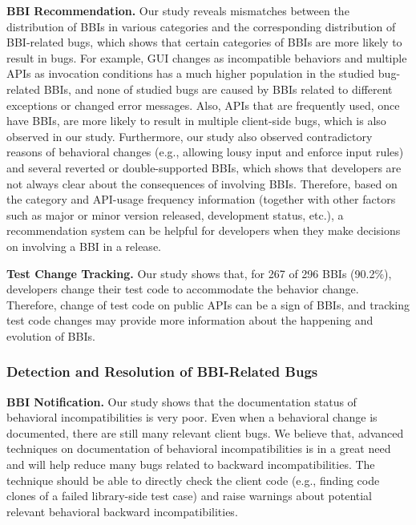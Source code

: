 


\textbf{BBI Recommendation.} Our study reveals mismatches between the distribution of BBIs in various categories and the corresponding distribution of BBI-related bugs, which shows that certain categories of BBIs are more likely to result in bugs. For example, GUI changes as incompatible behaviors and multiple APIs as invocation conditions has a much higher population in the studied bug-related BBIs, and none of studied bugs are caused by BBIs related to different exceptions or changed error messages. Also, APIs that are frequently used, once have BBIs, are more likely to result in multiple client-side bugs, which is also observed in our study. Furthermore, our study also observed contradictory reasons of behavioral changes (e.g., allowing lousy input and enforce input rules) and several reverted or double-supported BBIs, which shows that developers are not always clear about the consequences of involving BBIs. Therefore, based on the category and API-usage frequency information (together with other factors such as major or minor version released, development status, etc.), a recommendation system can be helpful for developers when they make decisions on involving a BBI in a release. 

\textbf{Test Change Tracking.} Our study shows that, for 267 of 296 BBIs (90.2\%), developers change their test code to accommodate the behavior change. Therefore, change of test code on public APIs can be a sign of BBIs, and tracking test code changes may provide more information about the happening and evolution of BBIs. 




\subsubsection{Detection and Resolution of BBI-Related Bugs}
\textbf{BBI Notification.} Our study shows that the documentation status of behavioral incompatibilities is very poor. Even when a behavioral change is documented, there are still many relevant client bugs. We believe that, advanced techniques on documentation of behavioral incompatibilities is in a great need and will help reduce many bugs related to backward incompatibilities. The technique should be able to directly check the client code (e.g., finding code clones of a failed library-side test case) and raise warnings about potential relevant behavioral backward incompatibilities. 

